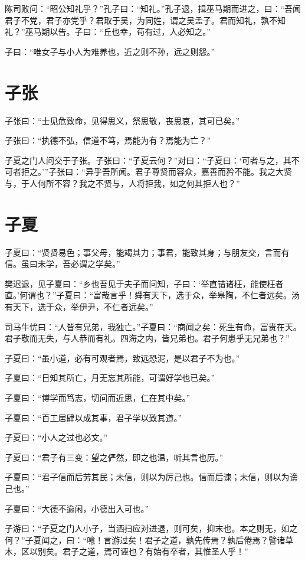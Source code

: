 \documentclass[a5paper]{ctexbook}
\begin{document}
    陈司败问：“昭公知礼乎？”孔子曰：“知礼。”孔子退，揖巫马期而进之，曰：“吾闻君子不党，君子亦党乎？君取于吴，为同姓，谓之吴孟子。君而知礼，孰不知礼？”巫马期以告。子曰：“丘也幸，苟有过，人必知之。”

    子曰：“唯女子与小人为难养也，近之则不孙，远之则怨。”

    \chapter{子张}

    子张曰：“士见危致命，见得思义，祭思敬，丧思哀，其可已矣。”
    
    子张曰：“执德不弘，信道不笃，焉能为有？焉能为亡？”
    
    子夏之门人问交于子张。子张曰：“子夏云何？”对曰：“子夏曰：‘可者与之，其不可者拒之。’”子张曰：“异乎吾所闻。君子尊贤而容众，嘉善而矜不能。我之大贤与，于人何所不容？我之不贤与，人将拒我，如之何其拒人也？”

    \chapter{子夏}

    子夏曰：“贤贤易色；事父母，能竭其力；事君，能致其身；与朋友交，言而有信。虽曰未学，吾必谓之学矣。”

    樊迟退，见子夏曰：“乡也吾见于夫子而问知，子曰：‘举直错诸枉，能使枉者直。’何谓也？”子夏曰：“富哉言乎！舜有天下，选于众，举皋陶，不仁者远矣。汤有天下，选于众，举伊尹，不仁者远矣。”

    司马牛忧曰：“人皆有兄弟，我独亡。”子夏曰：“商闻之矣：死生有命，富贵在天。君子敬而无失，与人恭而有礼。四海之内，皆兄弟也。君子何患乎无兄弟也？”

    子夏曰：“虽小道，必有可观者焉，致远恐泥，是以君子不为也。”
    
    子夏曰：“日知其所亡，月无忘其所能，可谓好学也已矣。”
    
    子夏曰：“博学而笃志，切问而近思，仁在其中矣。”

    子夏曰：“百工居肆以成其事，君子学以致其道。”
    
    子夏曰：“小人之过也必文。”
    
    子夏曰：“君子有三变：望之俨然，即之也温，听其言也厉。”

    子夏曰：“君子信而后劳其民；未信，则以为厉己也。信而后谏；未信，则以为谤己也。”
    
    子夏曰：“大德不逾闲，小德出入可也。”
    
    子游曰：“子夏之门人小子，当洒扫应对进退，则可矣，抑末也。本之则无，如之何？”子夏闻之，曰：“噫！言游过矣！君子之道，孰先传焉？孰后倦焉？譬诸草木，区以别矣。君子之道，焉可诬也？有始有卒者，其惟圣人乎！”
\end{document}
